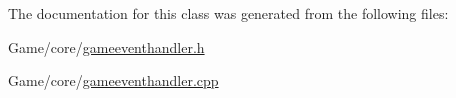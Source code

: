 The documentation for this class was generated from the following files\-:\begin{DoxyCompactItemize}
\item 
Game/core/\hyperlink{gameeventhandler_8h}{gameeventhandler.\-h}\item 
Game/core/\hyperlink{gameeventhandler_8cpp}{gameeventhandler.\-cpp}\end{DoxyCompactItemize}
